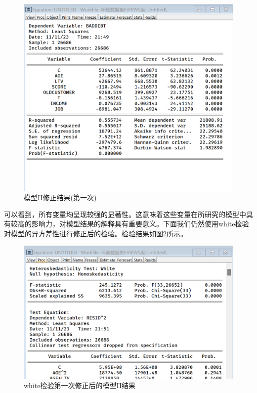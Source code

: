 \documentclass[13.5pt,hyperref,a4paper,UTF8]{ctexart}
\begin{document}
\begin{figure}[H]
    \centering
    \includegraphics[width=1\linewidth]{figures//3回归//回归2/模型II修正结果.png}
    \caption{模型II修正结果(第一次)}
    \label{模型II修正结果}
\end{figure}

可以看到，所有变量均呈现较强的显著性。这意味着这些变量在所研究的模型中具有较高的影响力，对模型结果的解释具有重要意义。下面我们仍然使用white检验对模型的异方差性进行修正后的检验。检验结果如图\ref{white检验修正2-1}所示。

\begin{figure}[H]
    \centering
    \includegraphics[width=0.75\linewidth]{figures//3回归//回归2/white检验修正.png}
    \caption{white检验第一次修正后的模型II结果}
    \label{white检验修正2-1}
\end{figure}
\end{document}
